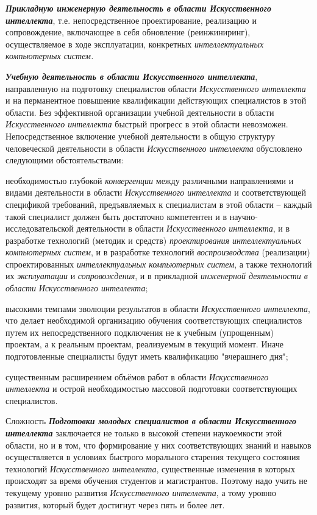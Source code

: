 \begin{textitemize}
	\item
	\textbf{\textit{Прикладную инженерную деятельность в области Искусственного интеллекта}}, т.е. непосредственное проектирование, реализацию и сопровождение, включающее в себя обновление (реинжиниринг), осуществляемое в ходе эксплуатации, конкретных \textit{интеллектуальных компьютерных систем.}
	\item
	\textbf{\textit{Учебную деятельность в области Искусственного интеллекта}}, направленную на подготовку специалистов области \textit{Искусственного интеллекта} и на перманентное повышение квалификации действующих специалистов в этой области. Без эффективной организации учебной деятельности в области \textit{Искусственного интеллекта} быстрый прогресс в этой области невозможен. Непосредственное включение учебной деятельности в общую структуру человеческой деятельности в области \textit{Искусственного интеллекта} обусловлено следующими обстоятельствами:
	\begin{textitemize}
		\item
		необходимостью глубокой \textit{конвергенции} между различными направлениями и видами деятельности в области \textit{Искусственного интеллекта} и соответствующей спецификой требований, предъявляемых к специалистам в этой области -- каждый такой специалист должен быть достаточно компетентен и в научно-исследовательской деятельности в области \textit{Искусственного интеллекта}, и в разработке технологий (методик и средств) \textit{проектирования интеллектуальных компьютерных систем}, и в разработке технологий \textit{воспроизводства} (реализации) спроектированных \textit{интеллектуальных компьютерных систем}, а также технологий их \textit{эксплуатации} и \textit{сопровождения}, и в прикладной \textit{инженерной деятельности в области} \textit{Искусственного интеллекта};
		\item
		высокими темпами эволюции результатов в области \textit{Искусственного интеллекта}, что делает необходимой организацию обучения соответствующих специалистов путем их непосредственного подключения не к учебным (упрощенным) проектам, а к реальным проектам, реализуемым в текущий момент. Иначе подготовленные специалисты будут иметь квалификацию "вчерашнего дня"{};
		\item
		существенным расширением объёмов работ в области \textit{Искусственного интеллекта} и острой необходимостью массовой подготовки соответствующих специалистов.
	\end{textitemize}
	
	Сложность \textbf{\textit{Подготовки молодых специалистов в области Искусственного интеллекта}} заключается не только в высокой степени наукоемкости этой области, но и в том, что формирование у них соответствующих знаний и навыков осуществляется в условиях быстрого морального старения текущего состояния технологий \textit{Искусственного интеллекта}, существенные изменения в которых происходят за время обучения студентов и магистрантов. Поэтому надо учить не текущему уровню развития \textit{Искусственного интеллекта}, а тому уровню развития, который будет достигнут через пять и более лет.
	

\end{textitemize}
